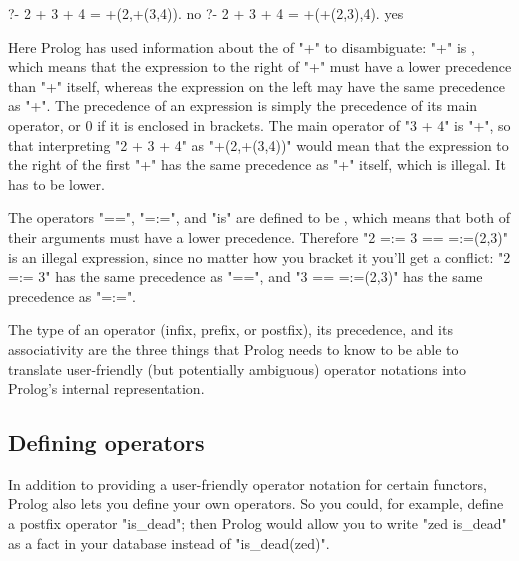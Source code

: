 \begin{LPNcodedisplay}
?- 2 + 3 + 4 = +(2,+(3,4)).
no
?- 2 + 3 + 4 = +(+(2,3),4).
yes
\end{LPNcodedisplay}


Here Prolog has used information about the  of
"+"  to disambiguate:  "+" is , which means that the expression to the right of "+" must
have a lower precedence than "+" itself, whereas the expression on the
left may have the same precedence as "+". The precedence of an
expression is simply the precedence of its main operator,  or 0 if it
is enclosed in brackets.  The main operator of "3 + 4" is "+", so that
interpreting "2 + 3 + 4" as "+(2,+(3,4))" would mean that the
expression to the right of the first "+" has the same precedence as
"+" itself, which is illegal. It has to be lower.

The operators "==", "=:=", and "is" are defined to be
, which means that both of their arguments must have
a lower precedence. Therefore "2 =:= 3 == =:=(2,3)" is an illegal
expression,
since no matter how you bracket it you'll get a conflict:
"2 =:= 3" has the same precedence as "==", and
"3 == =:=(2,3)" has the same precedence as "=:=".

The type of an operator (infix, prefix, or postfix), its precedence,
and its associativity are the three things that Prolog needs to know
to be able to translate user-friendly (but potentially ambiguous)
operator notations into Prolog's internal representation.



\subsection*{Defining operators}\label{SUBSEC.L9.OPERATORS.DEF}



In addition to providing a user-friendly operator notation for certain
functors, Prolog also lets you define your own operators. So you
could, for example, define a postfix operator "is\_dead"; then
Prolog would allow you to write "zed is\_dead" as a fact in your
database instead of "is\_dead(zed)".

